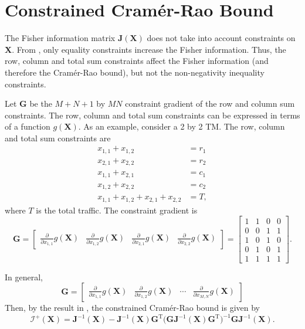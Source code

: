 \documentclass[12pt]{article}
\numberwithin{equation}{section}
\numberwithin{table}{section}
\numberwithin{figure}{section}
\newcommand{\ben}{\begin{equation*}}
\newcommand{\een}{\end{equation*}}
\newcommand{\T}{\mathrm{T}}
\def\bG{\mathbf{G}}
\def\bJ{\mathbf{J}}
\def\bX{\mathbf{X}}
\def\cI{\boldsymbol{\mathcal{I}}}
\begin{document}
\section{Constrained Cram\'er-Rao Bound}

The Fisher information matrix $\bJ(\bX)$ does not take into account constraints on $\bX$. From \cite{Gorman90CRB}, only equality constraints 
increase the Fisher information. Thus, the row, column and total sum constraints affect the Fisher information (and therefore the Cram\'er-Rao 
bound), but not the non-negativity inequality constraints.

Let $\bG$ be the $M+N+1$ by $MN$ constraint gradient of the row and column sum constraints. The row, column and total sum constraints can 
be expressed in terms of a function $g(\bX)$. As an example, consider a 2 by 2 TM. The row, column and total sum constraints are
\begin{align*}
x_{1,1} + x_{1,2} &= r_1\\
x_{2,1} + x_{2,2} &= r_2\\
x_{1,1} + x_{2,1} &= c_1\\
x_{1,2} + x_{2,2} &= c_2\\
x_{1,1} + x_{1,2} + x_{2,1} + x_{2,2} &= T,
\end{align*}
where $T$ is the total traffic. The constraint gradient is
\ben
\bG =
\begin{bmatrix}
\frac{\partial}{\partial x_{1,1}} g(\bX) & \frac{\partial}{\partial x_{1,2}} g(\bX) & \frac{\partial}{\partial x_{2,1}} g(\bX)
 & \frac{\partial}{\partial x_{2,2}} g(\bX)
\end{bmatrix}
=
\begin{bmatrix}
1 & 1 & 0 & 0\\
0 & 0 & 1 & 1\\
1 & 0 & 1 & 0\\
0 & 1 & 0 & 1\\
1 & 1 & 1 & 1
\end{bmatrix}.
\een

In general, 
\ben
\bG =
\begin{bmatrix}
\frac{\partial}{\partial x_{1,1}} g(\bX) & \frac{\partial}{\partial x_{1,2}} g(\bX) & \cdots
 & \frac{\partial}{\partial x_{M,N}} g(\bX)
\end{bmatrix}
\een
Then, by the result in \cite{Gorman90CRB}, the constrained Cram\'er-Rao bound is given by
\ben
\cI^+(\bX) = \bJ^{-1} (\bX) - \bJ^{-1} (\bX) \bG^\T \Big(\bG \bJ^{-1} (\bX) \bG^\T \Big)^{-1} \bG \bJ^{-1} (\bX).
\een 



\end{document}
